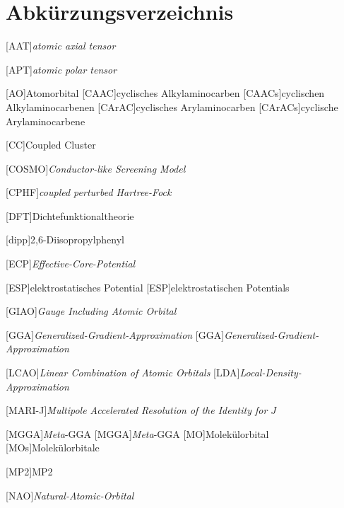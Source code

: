  {}
\renewcommand\refname{Abkürzungsverzeichnis} \chapter*{Abkürzungsverzeichnis}
\begin{acronym}[SEPSEP] %
    \setlength{\itemsep}{0.2cm} %
    
    [AAT]{\textit{atomic axial tensor}}
    
    [APT]{\textit{atomic polar tensor}}
    
    [AO]{Atomorbital}
	[CAAC]{cyclisches Alkylaminocarben}   
		[CAACs]{cyclischen Alkylaminocarbenen}
	[CArAC]{cyclisches Arylaminocarben}
		[CArACs]{cyclische Arylaminocarbene}
		
    [CC]{Coupled Cluster}		
		
 	[COSMO]{\textit{Conductor-like Screening Model}}
 	
	[CPHF]{\textit{coupled perturbed Hartree-Fock}}
 	
    [DFT]{Dichtefunktionaltheorie}
    
    [dipp]{2,6-Diisopropylphenyl}
    
    [ECP]{\textit{Effective-Core-Potential}}
    
    [ESP]{elektrostatisches Potential}
	    [ESP]{elektrostatischen Potentials}
	
	[GIAO]{\textit{Gauge Including Atomic Orbital}}    

	[GGA]{\textit{Generalized-Gradient-Approximation}}   
		[GGA]{\textit{Generalized-Gradient-Approximation}}
		
	[LCAO]{\textit{Linear Combination of Atomic Orbitals}}
	[LDA]{\textit{Local-Density-Approximation}}
     
    [MARI-J]{\textit{Multipole Accelerated Resolution of the Identity for $J$}} 	
 	
	[MGGA]{\textit{Meta}-GGA}   
		{\textit{Meta}-GGA}	
	[MO]{Molekülorbital}   
		[MOs]{Molekülorbitale}
		
	[MP2]{MP2}
		
    [NAO]{\textit{Natural-Atomic-Orbital}}


\end{acronym}
